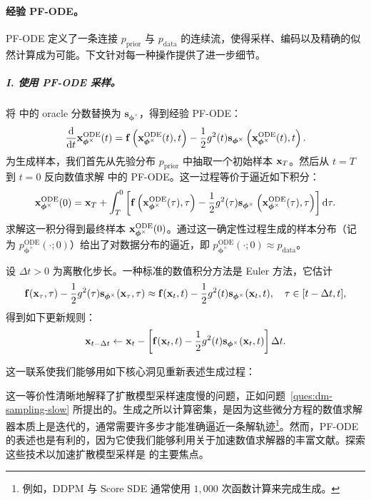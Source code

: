 \paragraph{经验 PF-ODE。}
PF-ODE 定义了一条连接 $p_{\mathrm{prior}}$ 与 $p_{\mathrm{data}}$ 的连续流，使得采样、编码以及精确的似然计算成为可能。下文针对每一种操作提供了进一步细节。
\subparagraph{I. 使用 PF-ODE 采样。}将  中的 oracle 分数替换为 $\mathbf{s}_{\bm{\phi}^\times}$，得到经验 PF-ODE：
\begin{equation}\label{eq:prob_ode_sub}
    \frac{\mathop{}\!\mathrm{d}}{\mathop{}\!\mathrm{d} t} {\mathbf{x}}^{\mathrm{ODE}}_{\bm{\phi}^\times}(t) = \mathbf{f}\left({\mathbf{x}}^{\mathrm{ODE}}_{\bm{\phi}^\times}(t), t\right) - \frac{1}{2} g^2(t) \mathbf{s}_{\bm{\phi}^\times}\left({\mathbf{x}}^{\mathrm{ODE}}_{\bm{\phi}^\times}(t), t\right).
\end{equation}
为生成样本，我们首先从先验分布 $p_{\mathrm{prior}}$ 中抽取一个初始样本 ${\mathbf{x}}_T$。然后从 $t=T$ 到 $t=0$ 反向数值求解  中的 PF-ODE。这一过程等价于逼近如下积分：
\[
{\mathbf{x}}^{\mathrm{ODE}}_{\bm{\phi}^\times}(0) = {\mathbf{x}}_T + \int_T^0 \left[ \mathbf{f}\left({\mathbf{x}}^{\mathrm{ODE}}_{\bm{\phi}^\times}(\tau), \tau\right) - \frac{1}{2} g^2(\tau) \mathbf{s}_{\bm{\phi}^\times}\left({\mathbf{x}}^{\mathrm{ODE}}_{\bm{\phi}^\times}(\tau), \tau\right) \right] \mathrm{d}\tau.
\]
求解这一积分得到最终样本 ${\mathbf{x}}^{\mathrm{ODE}}_{\bm{\phi}^\times}(0)$。通过这一确定性过程生成的样本分布（记为 $p_{\bm{\phi}^\times}^{\mathrm{ODE}}(\cdot; 0)$）给出了对数据分布的逼近，即 $p_{\bm{\phi}^\times}^{\mathrm{ODE}}(\cdot; 0) \approx p_{\mathrm{data}}$。

设 $\Delta t > 0$ 为离散化步长。一种标准的数值积分方法是 Euler 方法，它估计
\[
\mathbf{f}({\mathbf{x}}_\tau, \tau) - \frac{1}{2} g^2(\tau)  
\mathbf{s}_{\bm{\phi}^\times}({\mathbf{x}}_\tau, \tau) \approx \mathbf{f}({\mathbf{x}}_t, t) - \frac{1}{2} g^2(t)  
\mathbf{s}_{\bm{\phi}^\times}({\mathbf{x}}_t, t), \quad \tau \in [t-\Delta t, t],
\]
得到如下更新规则：
\begin{equation}\label{eq:euler-ode}
{\mathbf{x}}_{t - \Delta t} \leftarrow {\mathbf{x}}_t -
\left[ \mathbf{f}({\mathbf{x}}_t, t) - \frac{1}{2} g^2(t)  
\mathbf{s}_{\bm{\phi}^\times}({\mathbf{x}}_t, t) \right] \Delta t.
\end{equation}


这一联系使我们能够用如下核心洞见重新表述生成过程：

这一等价性清晰地解释了扩散模型采样速度慢的问题，正如问题~\ref{ques:dm-sampling-slow} 所提出的。生成之所以计算密集，是因为这些微分方程的数值求解器本质上是迭代的，通常需要许多步才能准确逼近一条解轨迹\footnote{例如，DDPM 与 Score SDE 通常使用 $1{,}000$ 次函数计算来完成生成。}。然而，PF-ODE 的表述也是有利的，因为它使我们能够利用关于加速数值求解器的丰富文献。探索这些技术以加速扩散模型采样是  的主要焦点。



